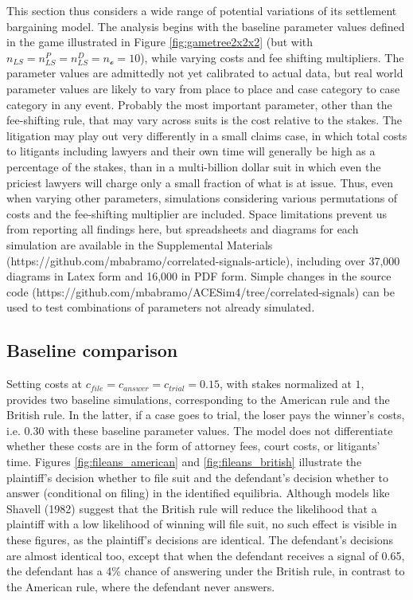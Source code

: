 \documentclass{article}
\begin{document}
This section thus considers a wide range of potential variations of its settlement bargaining model. The analysis begins with the baseline parameter values defined in the game illustrated in Figure \ref{fig:gametree2x2x2} (but with $n_{LS}=n_{LS}^P=n_{LS}^D=n_{\mathcal{o}}=10$), while varying costs and fee shifting multipliers. The parameter values are admittedly not yet calibrated to actual data, but real world parameter values are likely to vary from place to place and case category to case category in any event. Probably the most important parameter, other than the fee-shifting rule, that may vary across suits is the cost relative to the stakes. The litigation may play out very differently in a small claims case, in which total costs to litigants including lawyers and their own time will generally be high as a percentage of the stakes, than in a multi-billion dollar suit in which even the priciest lawyers will charge only a small fraction of what is at issue. Thus, even when varying other parameters, simulations considering various permutations of costs and the fee-shifting multiplier are included. Space limitations prevent us from reporting all findings here, but spreadsheets and diagrams for each simulation are available in the Supplemental Materials (https://github.com/mbabramo/correlated-signals-article), including over 37,000 diagrams in Latex form and 16,000 in PDF form. Simple changes in the source code (https://github.com/mbabramo/ACESim4/tree/correlated-signals) can be used to test combinations of parameters not already simulated.

\subsection{Baseline comparison} \label{baseline}

Setting costs at $c_{file} = c_{answer} = c_{trial} = 0.15$, with stakes normalized at $1$, provides two baseline simulations, corresponding to the American rule and the British rule. In the latter, if a case goes to trial, the loser pays the winner's costs, i.e. $0.30$ with these baseline parameter values. The model does not differentiate whether these costs are in the form of attorney fees, court costs, or litigants' time. Figures \ref{fig:fileans_american} and \ref{fig:fileans_british} illustrate the plaintiff's decision whether to file suit and the defendant's decision whether to answer (conditional on filing) in the identified equilibria. Although models like Shavell (1982) \cite{shavell} suggest that the British rule will reduce the likelihood that a plaintiff with a low likelihood of winning will file suit, no such effect is visible in these figures, as the plaintiff's decisions are identical. The defendant's decisions are almost identical too, except that when the defendant receives a signal of 0.65, the defendant has a 4\% chance of answering under the British rule, in contrast to the American rule, where the defendant never answers. 
\end{document}
